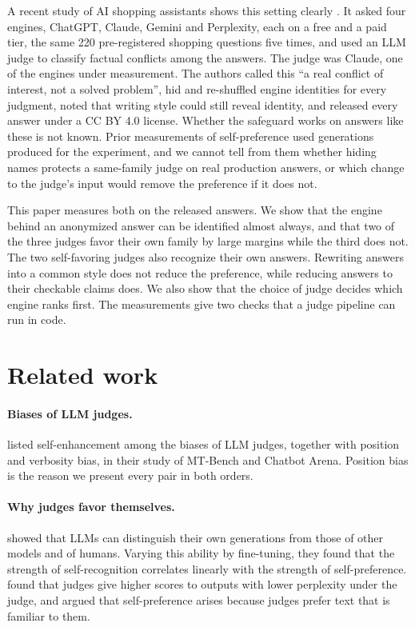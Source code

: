 \documentclass{article}
\begin{document}
A recent study of AI shopping assistants shows this setting clearly \citep{productai2026divergence}. It asked four engines, ChatGPT, Claude, Gemini and Perplexity, each on a free and a paid tier, the same 220 pre-registered shopping questions five times, and used an LLM judge to classify factual conflicts among the answers. The judge was Claude, one of the engines under measurement. The authors called this ``a real conflict of interest, not a solved problem'', hid and re-shuffled engine identities for every judgment, noted that writing style could still reveal identity, and released every answer under a CC BY 4.0 license. Whether the safeguard works on answers like these is not known. Prior measurements of self-preference used generations produced for the experiment, and we cannot tell from them whether hiding names protects a same-family judge on real production answers, or which change to the judge's input would remove the preference if it does not.

This paper measures both on the released answers. We show that the engine behind an anonymized answer can be identified almost always, and that two of the three judges favor their own family by large margins while the third does not. The two self-favoring judges also recognize their own answers. Rewriting answers into a common style does not reduce the preference, while reducing answers to their checkable claims does. We also show that the choice of judge decides which engine ranks first. The measurements give two checks that a judge pipeline can run in code.

\section{Related work}
\label{sec:related}

\paragraph{Biases of LLM judges.} \citet{zheng2023judging} listed self-enhancement among the biases of LLM judges, together with position and verbosity bias, in their study of MT-Bench and Chatbot Arena. Position bias is the reason we present every pair in both orders.

\paragraph{Why judges favor themselves.} \citet{panickssery2024llm} showed that LLMs can distinguish their own generations from those of other models and of humans. Varying this ability by fine-tuning, they found that the strength of self-recognition correlates linearly with the strength of self-preference. \citet{wataoka2024self} found that judges give higher scores to outputs with lower perplexity under the judge, and argued that self-preference arises because judges prefer text that is familiar to them.
\end{document}
